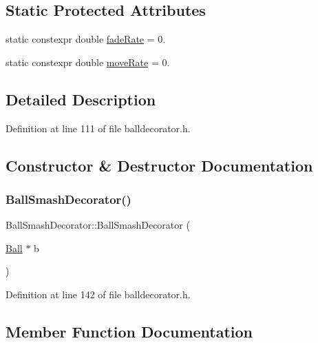 \subsection*{Static Protected Attributes}
\begin{DoxyCompactItemize}
\item 
static constexpr double \mbox{\hyperlink{class_ball_smash_decorator_aeef9438a9102847ca841bc657605e88b}{fade\+Rate}} = 0.
\item 
static constexpr double \mbox{\hyperlink{class_ball_smash_decorator_a947a58aafc3f976931a532974d89abe0}{move\+Rate}} = 0.
\end{DoxyCompactItemize}


\subsection{Detailed Description}


Definition at line 111 of file balldecorator.\+h.



\subsection{Constructor \& Destructor Documentation}
\mbox{\label{class_ball_smash_decorator_a9820f584d49fa51ccf288b6bb4700744}} 
\subsubsection{\texorpdfstring{Ball\+Smash\+Decorator()}{BallSmashDecorator()}}
{\footnotesize\ttfamily Ball\+Smash\+Decorator\+::\+Ball\+Smash\+Decorator (\begin{DoxyParamCaption}\item[{\mbox{\hyperlink{class_ball}{Ball}} $\ast$}]{b }\end{DoxyParamCaption})\hspace{0.3cm}{\ttfamily [inline]}}



Definition at line 142 of file balldecorator.\+h.



\subsection{Member Function Documentation}
\mbox{\label{class_ball_smash_decorator_aa800f137e36d43bdfa86843091905186}} 
